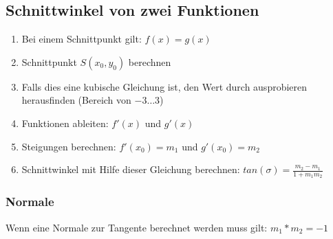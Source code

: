 \subsection{Schnittwinkel von zwei Funktionen}
	\begin{enumerate}
		\item Bei einem Schnittpunkt gilt: $f(x)=g(x)$
		\item Schnittpunkt $S(x_0,y_0)$ berechnen
		\item Falls dies eine kubische Gleichung ist, den Wert durch ausprobieren herausfinden (Bereich von $-3 \dots 3$)
		\item Funktionen ableiten: $f'(x)$ und $g'(x)$
		\item Steigungen berechnen: $f'(x_0)=m_1$ und $g'(x_0)=m_2$
		\item Schnittwinkel mit Hilfe dieser Gleichung berechnen: $tan(\sigma)=\frac{m_2-m_1}{1+m_1m_2}$
	\end{enumerate}
	
\subsubsection{Normale}
	Wenn eine Normale zur Tangente berechnet werden muss gilt: $m_1*m_2=-1$